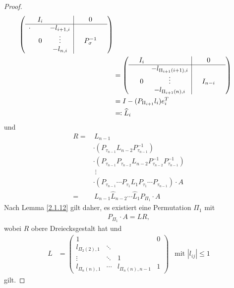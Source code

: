 \documentclass[ngerman,fontsize=11pt, paper=a4, parskip=half, titlepage=true, toc=bib]{scrbook}
\theoremstyle{definition}
\theoremstyle{plain}
\begin{document}
\begin{proof}
\begin{align*}
          \left(\begin{array}{ccc|ccc}
                  & I_i & && 0 & \\
                  \cline{1-6}
                  \cdot & & -l_{i+1, i} & & & \\
                  &  0 &  \vdots      & & P_{\sigma}^{-1} &\\
                  &     & -l_{n, i} & &  & 
		\end{array}\right) \\
    &= \left(\begin{array}{ccc|ccc}
               & I_i & && 0 & \\
               \cline{1-6}
               &     & -l_{\Pi_{i+1}(i+1), i} & & & \\
               &  0 &  \vdots      & & I_{n-i} &\\
               &     & -l_{\Pi_{i+1}(n), i} & &  & 
             \end{array}\right) \\
    &= I - (P_{\Pi_{i+1}} l_i)e_i^T\\
    &\eqqcolon \widehat{L}_i
  \end{align*}
  und
  \begin{align*}		R =&\, L_{n-1}\\
                                   &\cdot (P_{\tau_{n-1}}L_{n-2}P_{\tau_{n-1}}^{-1})\\
                                   &				\cdot (P_{\tau_{n-1}}P_{\tau_{n-2}}L_{n-2}P_{\tau_{n-2}}^{-1}P_{\tau_{n-1}}^{-1})\\
                                   &\; \vdots \\
                                   &		 \cdot (P_{\tau_{n-1}}\dotsm P_{\tau_{1}}L_{1}P_{\tau_{1}}\dotsm P_{\tau_{n-1}}) \cdot A\\
    =&\,L_{n-1}\widehat{L}_{n-2}\dotsm\widehat{L}_1P_{\Pi_{1}}\cdot A
  \end{align*}
  Nach Lemma \autoref{2.1.12} gilt daher, es existiert eine Permutation $\Pi_{1}$ mit
  \begin{gather*}
    P_{\Pi_1}\cdot A = LR ,
  \end{gather*}
  wobei $R$ obere Dreiecksgestalt hat und
  \begin{align*}
    L  &=  \begin{pmatrix}
      1 && & 0\\
      l_{\Pi_2(2),1} & \ddots & \\
      \vdots &            \ddots &  1\\
      l_{\Pi_n(n),1}& \dotsm &  l_{\Pi_n(n),n-1} & 1 
    \end{pmatrix} 
                     & \text{mit } |l_{ij}| \leq 1 
  \end{align*}
  gilt.
\end{proof}
\end{document}

